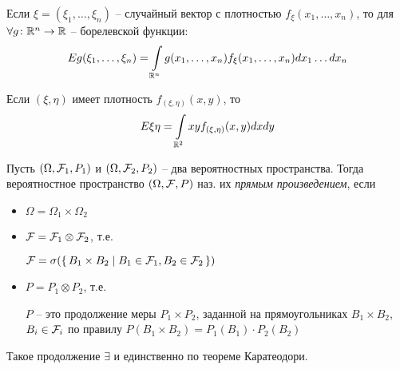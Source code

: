 \begin{remark}

  Если $\xi = (\xi_1, \ldots, \xi_n)$ -- случайный вектор 
  с плотностью $f_\xi (x_1, \ldots, x_n)$, то для 
  $\forall g\colon \mathbb{R}^n \to \mathbb{R}$ -- борелевской функции:
  \begin{align*}
    E g(\xi_1, \ldots, \xi_n) 
    = \int\limits_{\mathbb{R}^n} g(x_1, \ldots, x_n) f_{\xi} (x_1, \ldots, x_n) dx_1 \ldots dx_n
  \end{align*}

  \begin{example}
    Если $(\xi, \eta)$ имеет плотность $f_{(\xi, \eta)} (x, y)$, то
    \begin{align*}
      E \xi \eta = \int\limits_{\mathbb{R}^2} x y f_{(\xi, \eta)} (x, y) dx dy
    \end{align*}
  \end{example}

\end{remark}


\begin{definition}
  Пусть $(\Omega, \mathcal{F}_1, P_1)$ и $(\Omega, \mathcal{F}_2, P_2)$ -- два вероятностных пространства. 
  Тогда вероятностное пространство $(\Omega, \mathcal{F}, P)$ наз. их \emph{прямым произведением}, 
  если 
  \begin{itemize}
    \item 
      $\Omega = \Omega_1 \times \Omega_2$

    \item 
      $\mathcal{F} = \mathcal{F}_1 \otimes \mathcal{F}_2$, т.е.

      $\mathcal{F} = \sigma(\left\{ \, B_1 \times B_2 \mid B_1 \in \mathcal{F}_1, B_2 \in \mathcal{F}_2 \, \right\})$ 

    \item
      $P = P_1 \otimes  P_2$, т.е.

      $P$ -- это продолжение меры $P_1 \times P_2$, заданной на прямоугольниках $B_1 \times B_2$,
      $B_i \in \mathcal{F}_i$ по правилу $P(B_1 \times B_2) = P_1(B_1) \cdot P_2(B_2)$
  \end{itemize}

  Такое продолжение $\exists$ и единственно по теореме Каратеодори.

\end{definition}

